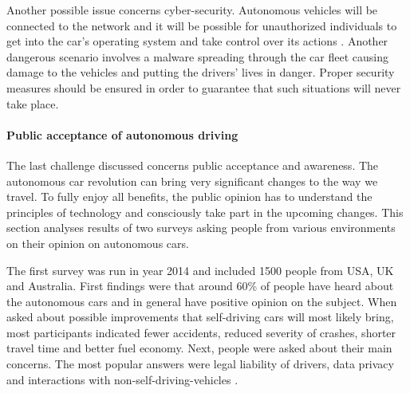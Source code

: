 \documentclass[11pt,english]{article}
\begin{document}
\par

Another possible issue concerns cyber-security. Autonomous vehicles  will be connected to the network and it will be possible for unauthorized individuals to get into the car's operating system and take control over its actions \citep{douma2012criminal}. Another dangerous scenario involves a malware spreading through the car fleet causing damage to the vehicles and putting the drivers’ lives in danger. Proper security measures should be ensured in order to guarantee that such situations will never take place.















\paragraph{Public acceptance of autonomous driving}

\par

The last challenge discussed concerns public acceptance and awareness. The autonomous car revolution can bring very significant changes to the way we travel. To fully enjoy all benefits, the public opinion has to understand the principles of technology and consciously take part in the upcoming changes. This section analyses results of two surveys asking people from various environments on their opinion on autonomous cars.

\par
The first survey was run in year 2014 and included 1500 people from USA, UK and Australia. First findings were that around 60\% of people have heard about the autonomous cars and in general have positive opinion on the subject. When asked about possible improvements that self-driving cars will most likely bring, most participants indicated fewer accidents, reduced severity of crashes, shorter travel time and better fuel economy. Next, people were asked about their main concerns. The most popular answers were legal liability of drivers, data privacy and interactions with non-self-driving-vehicles \citep{schoettle2014survey}.
\end{document}
